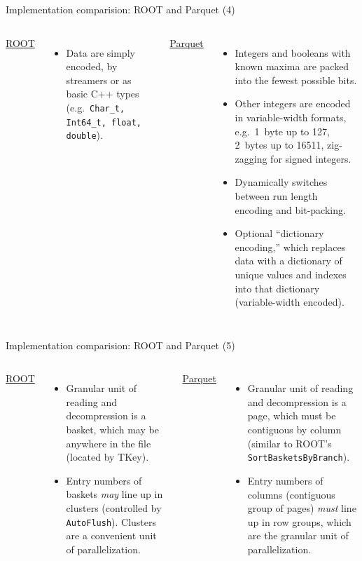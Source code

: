 \documentclass[aspectratio=169]{beamer}
\begin{document}
\begin{frame}{Implementation comparision: ROOT and Parquet (4)}
\vspace{0.5 cm}
\begin{columns}
{\large \underline{ROOT}}

\begin{itemize}
\item Data are simply encoded, by streamers or as basic C++ types (e.g.\ {\tt\small Char\_t, Int64\_t, float, double}).
\end{itemize}

{\large \underline{Parquet}}

\begin{itemize}
\item Integers and booleans with known maxima are packed into the fewest possible bits.

\item Other integers are encoded in variable-width formats, e.g.\ 1~byte up to 127, 2~bytes up to 16511, zig-zagging for signed integers.

\item Dynamically switches between run length encoding and bit-packing.

\item Optional ``dictionary encoding,'' which replaces data with a dictionary of unique values and indexes into that dictionary (variable-width encoded).
\end{itemize}
\end{columns}
\end{frame}

\begin{frame}{Implementation comparision: ROOT and Parquet (5)}
\vspace{0.5 cm}
\begin{columns}
{\large \underline{ROOT}}

\begin{itemize}
\item Granular unit of reading and decompression is a basket, which may be anywhere in the file (located by TKey).

\item Entry numbers of baskets {\it may} line up in clusters (controlled by {\tt\small AutoFlush}). Clusters are a convenient unit of parallelization.
\end{itemize}

{\large \underline{Parquet}}

\begin{itemize}
\item Granular unit of reading and decompression is a page, which must be contiguous by column (similar to ROOT's {\tt\small SortBasketsByBranch}).

\item Entry numbers of columns (contiguous group of pages) {\it must} line up in row groups, which are the granular unit of parallelization.
\end{itemize}
\end{columns}
\end{frame}
\end{document}
